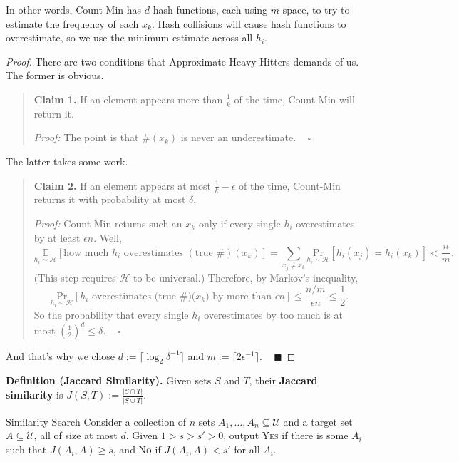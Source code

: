 In other words, Count-Min has $d$ hash functions, each using $m$ space, to try to estimate the frequency of each $x_k$.  Hash collisions will cause hash functions to overestimate, so we use the minimum estimate across all $h_i$.

\begin{proof}
    There are two conditions that Approximate Heavy Hitters demands of us.  The former is obvious.
    \begin{quote}
        \textbf{Claim 1.} If an element appears more than $\frac{1}{k}$ of the time, Count-Min will return it.

        \emph{Proof:} The point is that $\#(x_k)$ is never an underestimate. ~ $\square$
    \end{quote}
    The latter takes some work.
    \begin{quote}
        \textbf{Claim 2.} If an element appears at most $\frac{1}{k} - \epsilon$ of the time, Count-Min returns it with probability at most $\delta$.

        \emph{Proof:} Count-Min returns such an $x_k$ only if every single $h_i$ overestimates by at least $\epsilon n$.  Well,
        \[ \underset{h_i \sim \mathcal{H}}{\mathbb{E}}[\text{how much } h_i \text{ overestimates } (\text{true \#})(x_k)] = \sum_{x_j \neq x_k} \underset{h_i \sim \mathcal{H}}{\mathrm{Pr}} \left [ h_i(x_j) = h_i(x_k) \right ] < \dfrac{n}{m}. \]
        (This step requires $\mathcal{H}$ to be universal.) Therefore, by Markov's inequality,
        \[ \underset{h_i \sim \mathcal{H}}{\mathrm{Pr}}[h_i \text{ overestimates (true \#)($x_k$) by more than } \epsilon n] \leq \dfrac{n / m}{\epsilon n} \leq \dfrac{1}{2}. \]
        So the probability that every single $h_i$ overestimates by too much is at most $\left(\frac{1}{2}\right)^{d} \leq \delta$. ~ $\square$
    \end{quote}
    And that's why we chose $d := \lceil \log_2 \delta^{-1} \rceil$ and $m := \lceil 2 \epsilon^{-1} \rceil$. ~ $\blacksquare$
\end{proof}

\textbf{Definition (Jaccard Similarity).} Given sets $S$ and $T$, their \textbf{Jaccard similarity} is $J(S, T) := \frac{|S \cap T|}{|S \cup T|}$.

\begin{problem}{Similarity Search}
    Consider a collection of $n$ sets $A_1, \dots, A_n \subseteq \mathcal{U}$ and a target set $A \subseteq \mathcal{U}$, all of size at most $d$.  Given $1 > s > s' > 0$, output \textsc{Yes} if there is some $A_i$ such that $J(A_i, A) \geq s$, and \textsc{No} if $J(A_i, A) < s'$ for all $A_i$.
\end{problem}

